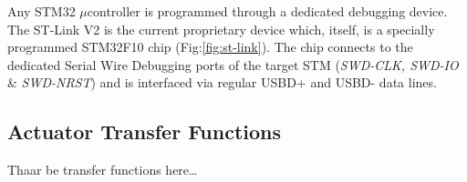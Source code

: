 \par
Any STM32 $\mu$controller is programmed through a dedicated debugging device. The ST-Link V2\cite{st-link} is the current proprietary device which, itself, is a specially programmed STM32F10 chip (Fig:\ref{fig:st-link}). The chip connects to the dedicated Serial Wire Debugging ports of the target STM (\emph{SWD-CLK, SWD-IO} \& \emph{SWD-NRST}) and is interfaced via regular USBD+ and USBD- data lines. 
\subsection{Actuator Transfer Functions}
\label{subsec:proto.design.transfer}
Thaar be transfer functions here\ldots

